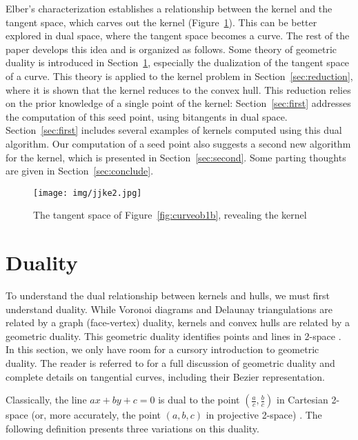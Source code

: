 \documentclass{sig-alternate}
\begin{document}
Elber's characterization establishes a relationship between the kernel 
and the tangent space,
which carves out the kernel (Figure~\ref{fig:kernelFromTangSpace}).
This can be better explored in dual space, where the tangent space
becomes a curve.
The rest of the paper develops this idea and is organized as follows.
Some theory of geometric duality is introduced in Section~\ref{sec:duality},
especially the dualization of the tangent space of a curve.
This theory is applied to the kernel problem in Section~\ref{sec:reduction},
where it is shown that the kernel reduces to the convex hull.
This reduction relies on the prior knowledge of a 
single point of the kernel:
Section~\ref{sec:first} addresses the computation of this seed point,
using bitangents in dual space.
Section~\ref{sec:first} includes several examples of kernels computed using
this dual algorithm.
Our computation of a seed point also suggests a second new algorithm
for the kernel, which is presented in Section~\ref{sec:second}.
Some parting thoughts are given in Section~\ref{sec:conclude}.

\begin{figure}
\begin{center}
\texttt{[image: img/jjke2.jpg]}
\end{center}
\caption{The tangent space of Figure~\ref{fig:curveob1b}, revealing the kernel}
\label{fig:kernelFromTangSpace}
\end{figure}


\section{Duality}
\label{sec:duality}

To understand the dual relationship between kernels and hulls,
we must first understand duality.
While Voronoi diagrams and Delaunay triangulations are 
related by a graph (face-vertex) duality, 
kernels and convex hulls are related by a geometric duality.
This geometric duality identifies points and lines in 2-space \cite{pedoe70}.
In this section, we only have room for 
a cursory introduction to geometric duality.
The reader is referred to \cite{jj01,jj02} for a full discussion of geometric duality
and complete details on tangential curves, including their Bezier representation.

Classically, the line $ax+by+c=0$ is dual to the point
$(\frac{a}{c},\frac{b}{c})$ in Cartesian 2-space
(or, more accurately, the point $(a,b,c)$ in projective 2-space)
\cite{hartshorne77}.
The following definition presents three variations on this duality.
\end{document}
